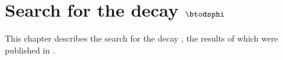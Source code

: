 \chapter{Search for the decay %
  \texorpdfstring{$\boldsymbol{\btodsphi}$}{\btodsphi}}
\label{ch:dsphi}

This chapter describes the search for the decay \btodsphi, the results of which were published in
.




\clearpage




%
%
%
%
%
%
%
%
%
%
%
%
%

